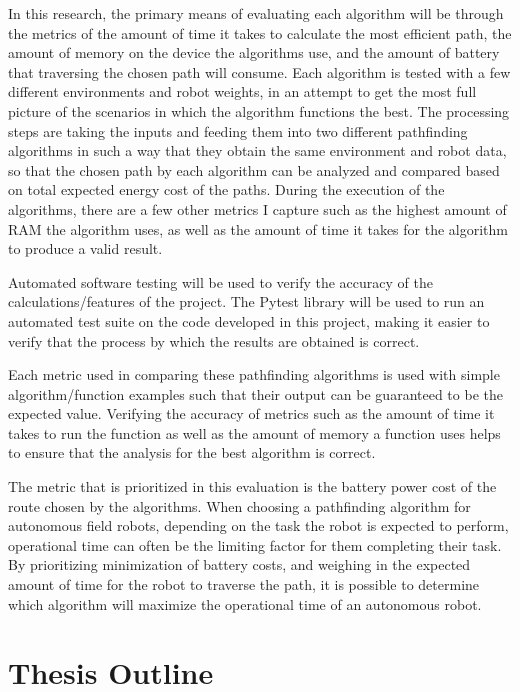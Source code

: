 In this research, the primary means of evaluating each algorithm will be through the metrics of the amount of time it takes to calculate the most efficient path, the amount of memory on the device the algorithms use, and the amount of battery that traversing the chosen path will consume. Each algorithm is tested with a few different environments and robot weights, in an attempt to get the most full picture of the scenarios in which the algorithm functions the best. The processing steps are taking the inputs and feeding them into two different pathfinding algorithms in such a way that they obtain the same environment and robot data, so that the chosen path by each algorithm can be analyzed and compared based on total expected energy cost of the paths. During the execution of the algorithms, there are a few other metrics I capture such as the highest amount of RAM the algorithm uses, as well as the amount of time it takes for the algorithm to produce a valid result. 
\par
Automated software testing will be used to verify the accuracy of the calculations/features of the project. The Pytest \cite{pytest_2021} library will be used to run an automated test suite on the code developed in this project, making it easier to verify that the process by which the results are obtained is correct.
\par
Each metric used in comparing these pathfinding algorithms is used with simple algorithm/function examples such that their output can be guaranteed to be the expected value. Verifying the accuracy of metrics such as the amount of time it takes to run the function as well as the amount of memory a function uses helps to ensure that the analysis for the best algorithm is correct.
\par
The metric that is prioritized in this evaluation is the battery power cost of the route chosen by the algorithms. When choosing a pathfinding algorithm for autonomous field robots, depending on the task the robot is expected to perform, operational time can often be the limiting factor for them completing their task. By prioritizing minimization of battery costs, and weighing in the expected amount of time for the robot to traverse the path, it is possible to determine which algorithm will maximize the operational time of an autonomous robot.

\section{Thesis Outline}
\label{sec:outline}